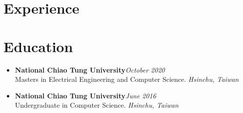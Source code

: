 \section{Experience}
\fi
\section{\sectionheading Education}

\begin{itemize}[leftmargin=0pt, label={}]%

\item{
{\sectionheading\large{\textbf{National Chiao Tung University}}}\hfill {\sectionheading\small{\textit{October 2020}}}\\
{\sectionheading\small{Masters in Electrical Engineering and Computer Science.}}\hfill
{\sectionheading\small{\textit{Hsinchu, Taiwan}}}

}
\item{
{\sectionheading\large{\textbf{National Chiao Tung University}}}\hfill {\sectionheading\small{\textit{June 2016}}}\\
{\sectionheading\small{Undergraduate in Computer Science.}}\hfill
{\sectionheading\small{\textit{Hsinchu, Taiwan}}}

}

\end{itemize}
